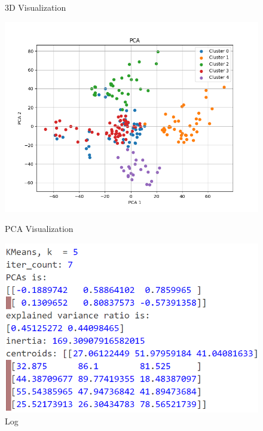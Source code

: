 \documentclass[8pt]{article}
\begin{document}
\begin{figure}[H]
\begin{minipage}{0.32\textwidth}
        \caption{3D Visualization}
        \label{fig: 3D Visualization k5 rand14}
    \end{minipage}
    \hfill
    \begin{minipage}{0.32\textwidth}
        \centering
        \includegraphics[width=\textwidth]{./Prob4/out/task1_rand14/images/PCA_k5.png}
        \caption{PCA Visualization}
        \label{fig: PCA Visualization k5 rand14}
    \end{minipage}
    \hfill
    \begin{minipage}{0.32\textwidth}
        \centering
        \includegraphics[width=\textwidth]{./Prob4/out/task1_rand14/log_k5.png}
        \caption{Log}
        \label{fig: log_k5.png rand14}
    \end{minipage}
\end{figure}
\end{document}
